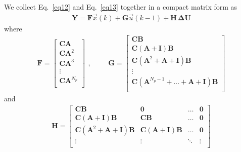 \documentclass[12pt,a4paper,oneside]{book}
\begin{document}
\begin{onehalfspace}
We collect Eq.~\eqref{eq12} and Eq.~\eqref{eq13} together in a compact matrix 
form as
\begin{equation}\label{eq15}
	\begin{aligned}
		\mathbf{Y}= 
		\mathbf{F}\vec{x}(k)+\mathbf{G}\vec{u}(k-1)+\mathbf{H}\,\mathbf{\Delta 
		U}
	\end{aligned}
\end{equation}
where 
\begin{equation}\label{eq16}
	\begin{aligned}
		\mathbf{F}= \begin{bmatrix}
			\mathbf{C}\mathbf{A} \\[6pt]
			\mathbf{C}\mathbf{A}^2 \\[6pt]
			\mathbf{C}\mathbf{A}^3 \\[6pt]
			\vdots \\[6pt]
			\mathbf{C}\mathbf{A}^{N_p} \\[6pt]
		\end{bmatrix}
	\end{aligned}, \qquad
	\begin{aligned}
		\mathbf{G}= \begin{bmatrix}
			\mathbf{C}\mathbf{B} \\[6pt]
			\mathbf{C}\left(\mathbf{A} +\mathbf{I}\right) \mathbf{B} \\[6pt]
			\mathbf{C}\left(\mathbf{A}^2+\mathbf{A} +\mathbf{I}\right) 
			\mathbf{B} \\[6pt]
			\vdots \\[6pt]
			\mathbf{C}\left(\mathbf{A}^{N_p-1}+...+\mathbf{A} 
			+\mathbf{I}\right)\mathbf{B} \\[6pt]
		\end{bmatrix}
	\end{aligned}
\end{equation}
and
\begin{equation}\label{eq17}
	\begin{aligned}
		\mathbf{H}= \begin{bmatrix}
			\mathbf{C}\mathbf{B} & \mathbf{0} & \dots & \mathbf{0}  \\[6pt]
			\mathbf{C}\left(\mathbf{A}+\mathbf{I}\right) \mathbf{B} & 
			\mathbf{C}\mathbf{B} & \dots & \mathbf{0} \\[6pt]
			\mathbf{C}\left(\mathbf{A}^2+\mathbf{A}+\mathbf{I}\right) 
			\mathbf{B} & \mathbf{C}\left(\mathbf{A}+\mathbf{I}\right)\mathbf{B} 
			& \dots & \mathbf{0} \\[6pt]
			\vdots & \vdots & \ddots  & \vdots \\[6pt]

\end{bmatrix}
\end{aligned}
\end{equation}
\end{onehalfspace}
\end{document}
